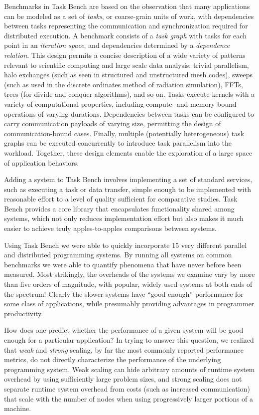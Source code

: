 Benchmarks in Task Bench are based on the observation that many applications can be modeled
as a set of \emph{tasks}, or coarse-grain units of work, with
dependencies between tasks representing the communication and synchronization required for
distributed execution. A benchmark consists of a \emph{task graph} with tasks for
each point in an \emph{iteration space}, and dependencies
determined by a \emph{dependence relation}. This design permits a
concise description of a wide variety of patterns relevant to
scientific computing and large scale data analysis: trivial parallelism, halo exchanges (such as
seen in structured and unstructured mesh codes), sweeps (such as used
in the discrete ordinates method of radiation simulation), FFTs, trees
(for divide and conquer algorithms), and so on. Tasks execute kernels with a
variety of computational properties, including compute- and
memory-bound operations of varying durations. Dependencies between
tasks can be configured to carry communication payloads of varying size, permitting
the design of communication-bound cases. Finally, multiple
(potentially heterogeneous) task graphs can be executed concurrently
to introduce task parallelism into the workload. Together, these
design elements enable the exploration of a large space of application
behaviors.

Adding a system to Task Bench involves  implementing a set of standard
services, such as executing a task or data transfer, simple enough to 
be implemented with reasonable effort to a level of quality sufficient for comparative
studies. Task Bench provides a core library that encapsulates functionality
shared among systems, which not only reduces implementation effort
but also makes it much easier to achieve truly apples-to-apples comparisons
between systems.

Using Task Bench we were able to quickly incorporate 15 very different parallel and distributed
programming systems.  By running all systems on common benchmarks we were able to quantify phenomena
that have never before been measured.
Most strikingly, the overheads of the systems we examine vary by more than five orders
of magnitude, with popular, widely used systems at both ends of the spectrum!  Clearly
the slower systems have ``good enough'' performance for some class of applications, while presumably
providing advantages in programmer productivity.

How does one predict whether the performance of a given
system will be good enough for a particular application?  In trying to answer this question,
we realized that \emph{weak} and \emph{strong} scaling, by far the most commonly
reported performance metrics, do not directly characterize the performance of the underlying
programming system. Weak scaling can hide arbitrary amounts of runtime
system overhead by using sufficiently large problem sizes, and strong
scaling does not separate runtime system overhead from costs
(such as increased communication) that scale with the number of nodes when
using progressively larger portions of a machine. 

